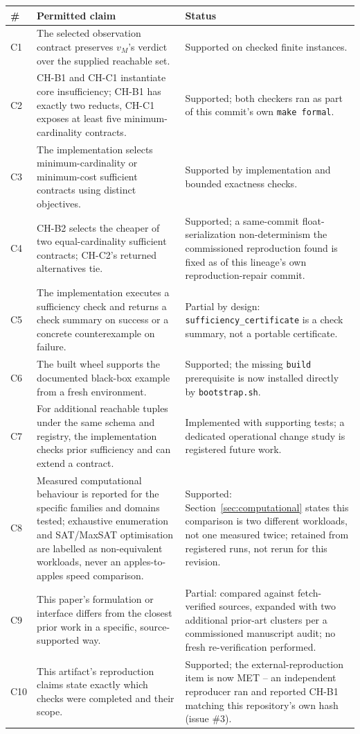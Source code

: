 \documentclass[11pt,a4paper]{article}
\theoremstyle{definition}
\begin{document}
\begin{center}
\begin{longtable}{p{}p{}p{}}
\toprule
\# & Permitted claim & Status \\
\midrule
\endhead
C1 & The selected observation contract preserves $v_M$'s verdict over the supplied reachable set. & Supported on checked finite instances. \\
C2 & CH-B1 and CH-C1 instantiate core insufficiency; CH-B1 has exactly two reducts, CH-C1 exposes at least five minimum-cardinality contracts. & Supported; both checkers ran as part of this commit's own \texttt{make formal}. \\
C3 & The implementation selects minimum-cardinality or minimum-cost sufficient contracts using distinct objectives. & Supported by implementation and bounded exactness checks. \\
C4 & CH-B2 selects the cheaper of two equal-cardinality sufficient contracts; CH-C2's returned alternatives tie. & Supported; a same-commit float-serialization non-determinism the commissioned reproduction found is fixed as of this lineage's own reproduction-repair commit. \\
C5 & The implementation executes a sufficiency check and returns a check summary on success or a concrete counterexample on failure. & Partial by design: \texttt{sufficiency\_certificate} is a check summary, not a portable certificate. \\
C6 & The built wheel supports the documented black-box example from a fresh environment. & Supported; the missing \texttt{build} prerequisite is now installed directly by \texttt{bootstrap.sh}. \\
C7 & For additional reachable tuples under the same schema and registry, the implementation checks prior sufficiency and can extend a contract. & Implemented with supporting tests; a dedicated operational change study is registered future work. \\
C8 & Measured computational behaviour is reported for the specific families and domains tested; exhaustive enumeration and SAT/MaxSAT optimisation are labelled as non-equivalent workloads, never an apples-to-apples speed comparison. & Supported: Section~\ref{sec:computational} states this comparison is two different workloads, not one measured twice; retained from registered runs, not rerun for this revision. \\
C9 & This paper's formulation or interface differs from the closest prior work in a specific, source-supported way. & Partial: compared against fetch-verified sources, expanded with two additional prior-art clusters per a commissioned manuscript audit; no fresh re-verification performed. \\
C10 & This artifact's reproduction claims state exactly which checks were completed and their scope. & Supported; the external-reproduction item is now MET -- an independent reproducer ran and reported CH-B1 matching this repository's own hash (issue \#3). \\
\bottomrule
\end{longtable}
\end{center}
\end{document}
